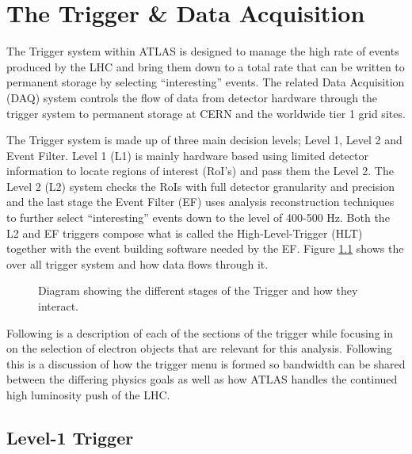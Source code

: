 \chapter{The Trigger \& Data Acquisition}

	The Trigger system within ATLAS is designed to manage the high rate of events produced by the LHC and bring them down to a total rate that can be written to permanent storage by selecting ``interesting'' events. The related Data Acquisition (DAQ) system controls the flow of data from detector hardware through the trigger system to permanent storage at CERN and the worldwide tier 1 grid sites. 

	The Trigger system is made up of three main decision levels; Level 1, Level 2 and Event Filter. Level 1 (L1) is mainly hardware based using limited detector information to locate regions of interest (RoI's) and pass them the Level 2. The Level 2 (L2) system checks the RoIs with full detector granularity and precision and the last stage the Event Filter (EF) uses analysis reconstruction techniques to further select ``interesting'' events down to the level of 400-500 Hz. Both the L2 and EF triggers compose what is called the High-Level-Trigger (HLT) together with the event building software needed by the EF. Figure \ref{fig:triggerFlow} shows the over all trigger system and how data flows through it.

	\begin{figure}[h]
        \begin{center}
        \end{center}
        \caption{Diagram showing the different stages of the Trigger and how they interact.}
        \label{fig:triggerFlow}
    \end{figure}


	Following is a description of each of the sections of the trigger while focusing in on the selection of electron objects that are relevant for this analysis. Following this is a discussion of how the trigger menu is formed so bandwidth can be shared between the differing physics goals as well as how ATLAS handles the continued high luminosity push of the LHC.


\section{Level-1 Trigger}

